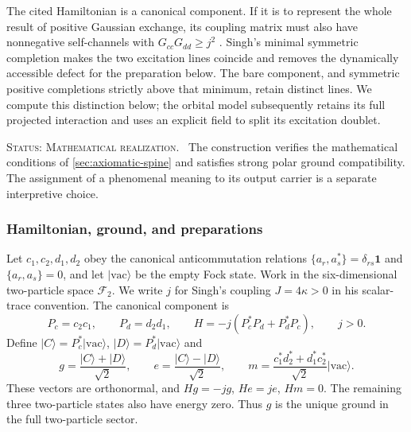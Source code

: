 \documentclass[11pt,reqno]{scrartcl}
\newcommand{\idop}{\mathbf 1}
\newcommand{\ket}[1]{\lvert #1\rangle}
\newcommand{\statuslabel}[1]{\par\smallskip\noindent\textsc{Status: #1.}\ }
\theoremstyle{plain}
\theoremstyle{definition}
\theoremstyle{remark}
\begin{document}
The cited Hamiltonian is a canonical component.  If it is to represent
the whole result of positive Gaussian exchange, its coupling matrix must
also have nonnegative self-channels with $G_{cc}G_{dd}\geq j^2$
\cite[Eq.~(3.12)]{Singh2026PairTransfer}.  Singh's minimal symmetric
completion makes the two excitation lines coincide and removes the
dynamically accessible defect for the preparation below.  The bare
component, and symmetric positive completions strictly above that
minimum, retain distinct lines.  We compute this distinction below;
the orbital model subsequently
retains its full projected interaction and uses an explicit field to
split its excitation doublet.

\statuslabel{Mathematical realization}
The construction verifies the mathematical conditions of
\cref{sec:axiomatic-spine} and satisfies strong polar ground compatibility.
The assignment of a phenomenal meaning to its output carrier is a separate
interpretive choice.

\subsubsection*{Hamiltonian, ground, and preparations}
Let $c_1,c_2,d_1,d_2$ obey the canonical anticommutation relations
$\{a_r,a_s^*\}=\delta_{rs}\idop$ and $\{a_r,a_s\}=0$, and let
$\ket{\mathrm{vac}}$ be the empty Fock state.  Work in the six-dimensional
two-particle space $\mathcal F_2$.  We write $j$ for Singh's coupling
$J=4\kappa>0$ in his scalar-trace convention.  The canonical component is
\begin{equation}
  P_c=c_2c_1,\qquad P_d=d_2d_1,\qquad
  H=-j(P_c^*P_d+P_d^*P_c),\qquad j>0 .
  \label{eq:pair-parent}
\end{equation}
Define $\ket C=P_c^*\ket{\mathrm{vac}}$,
$\ket D=P_d^*\ket{\mathrm{vac}}$ and
\begin{equation}
  g=\frac{\ket C+\ket D}{\sqrt2},\qquad
  e=\frac{\ket C-\ket D}{\sqrt2},\qquad
  m=\frac{c_1^*d_2^*+d_1^*c_2^*}{\sqrt2}\ket{\mathrm{vac}} .
  \label{eq:pair-energy-vectors}
\end{equation}
These vectors are orthonormal, and
$Hg=-jg$, $He=je$, $Hm=0$.  The remaining three two-particle states
also have energy zero.  Thus $g$ is the unique ground in the full
two-particle sector.
\end{document}
